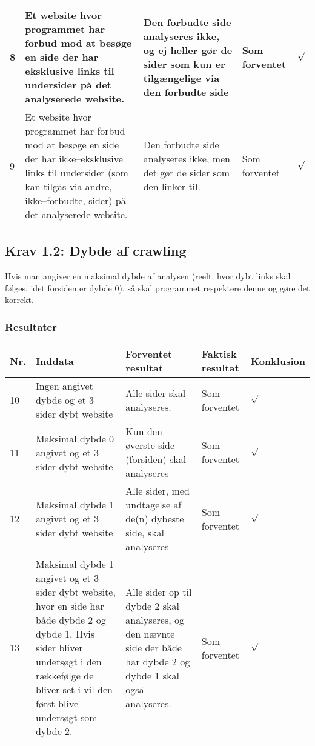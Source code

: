 \documentclass[a4paper,oneside,article]{memoir}
\begin{document}
\begin{landscape}
\begin{longtable}[c]{p{20pt}|p{220pt}|p{130pt}|p{130pt}|p{50pt}}
8 &
Et website hvor programmet har forbud mod at besøge en side der har
eksklusive links til undersider på det analyserede website. &
Den forbudte side analyseres ikke, og ej heller gør de sider som kun
er tilgængelige via den forbudte side &
Som forventet &
$\surd$ \\ \hline

9 &
Et website hvor programmet har forbud mod at besøge en side der har
ikke--eksklusive links til undersider (som kan tilgås via andre,
ikke--forbudte, sider) på det analyserede website. &
Den forbudte side analyseres ikke, men det gør de sider som den linker
til. &
Som forventet &
$\surd$ \\ \hline

\end{longtable}

\subsection{Krav 1.2: Dybde af crawling}
Hvis man angiver en maksimal dybde af analysen (reelt, hvor dybt links
skal følges, idet forsiden er dybde 0), så skal programmet respektere
denne og gøre det korrekt.

\subsubsection{Resultater}
\begin{longtable}[c]{p{20pt}|p{220pt}|p{130pt}|p{130pt}|p{50pt}}
\textbf{Nr.} &
\textbf{Inddata} &
\textbf{Forventet resultat} &
\textbf{Faktisk resultat} &
\textbf{Konklusion} \\ \hline

10 &
Ingen angivet dybde og et 3 sider dybt website &
Alle sider skal analyseres. &
Som forventet &
$\surd$ \\ \hline

11 &
Maksimal dybde 0 angivet og et 3 sider dybt website &
Kun den øverste side (forsiden) skal analyseres &
Som forventet &
$\surd$ \\ \hline

12 &
Maksimal dybde 1 angivet og et 3 sider dybt website &
Alle sider, med undtagelse af de(n) dybeste side, skal analyseres &
Som forventet &
$\surd$ \\ \hline

13 &
Maksimal dybde 1 angivet og et 3 sider dybt website, hvor en side har
både dybde 2 og dybde 1. Hvis sider bliver undersøgt i den rækkefølge de
bliver set i vil den først blive undersøgt som dybde 2. &
Alle sider op til dybde 2 skal analyseres, og den nævnte side der både
har dybde 2 og dybde 1 skal også analyseres. &
Som forventet &
$\surd$ \\ \hline


\end{longtable}
\end{landscape}
\end{document}
